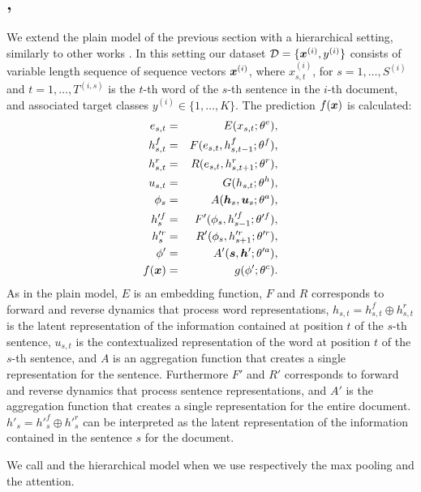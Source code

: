 \subsection{\maxh, \softmaxh}
\label{sec:modelh}
We extend the plain model of the previous section with a hierarchical setting,
similarly to other works \cite{yang_hierarchical_2016}. In this
setting our dataset $\mathcal{D}=\{\bm{x}^{(i)},y^{(i)}\}$
consists of variable length sequence of sequence vectors
$\bm{x}^{(i)}$, where $x_{s,t}^{(i)}$, for $s=1,\dots,S^{(i)}$ and
$t=1,\dots,T^{(i,s)}$ is the $t$-th word of the $s$-th sentence in the
$i$-th document, and associated target classes
$y^{(i)}\in\{1,\dots,K\}$. The prediction $f(\bm{x})$ is calculated:
\begin{align}
  e_{s,t} &=& E(x_{s,t};\theta^e),\label{eq:embedH}\\
  h^f_{s,t} &=& F(e_{s,t},h^f_{s,t-1};\theta^{f}),\label{eq:maxModelRLH}\\  
  h^r_{s,t} &=& R(e_{s,t},h^r_{s,t+1};\theta^{r}),\label{eq:maxModelRRH}\\
  u_{s,t} &=& G(h_{s,t};\theta^{h}),\label{eq:maxModelFH}\\
  \phi_s & =& A(\bm{h}_s,\bm{u}_s;\theta^{a}),\label{eq:aggregationH}\\
  h'^{f}_{s} &=& F'(\phi_{s},h'^{f}_{s-1};\theta'^{f}),\label{eq:maxModelRLHS}\\  
  h'^{r}_{s} &=& R'(\phi_{s},h'^{r}_{s+1};\theta'^{r}),\label{eq:maxModelRRHS}\\
  \phi' & =& A'(\bm{s},\bm{h}';\theta'^{a}),\label{eq:aggregationHS}\\
  f(\bm{x}) &=& g(\phi';\theta^c).\label{eq:maxModelCH}
\end{align}
As in the plain model, $E$ is an embedding function, $F$ and $R$
corresponds to forward and reverse dynamics that process word
representations,
$h_{s,t}=h_{s,t}^f\oplus h_{s,t}^r$ is the latent representation of
the information contained at position $t$ of the $s$-th sentence,
$u_{s,t}$ is the contextualized representation of the word at position
$t$ of the $s$-th sentence, and $A$ is an aggregation function that
creates a single representation for the sentence. Furthermore $F'$ and
$R'$ corresponds to 
forward and reverse dynamics that process sentence representations,
and $A'$ is the aggregation function that creates a single
representation for the entire document. $h'_s=h'^f_s\oplus h'^r_s$
can be interpreted as the
latent representation of the information contained in the sentence $s$
for the document.

We call \maxh{} and \softmaxh{} the hierarchical model when we use
respectively the max pooling and the attention.


